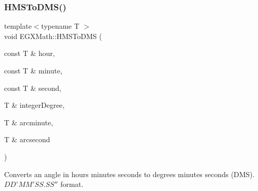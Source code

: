 \subsubsection{\texorpdfstring{H\+M\+S\+To\+D\+M\+S()}{HMSToDMS()}}
{\footnotesize\ttfamily template$<$typename T $>$ \\
void E\+G\+X\+Math\+::\+H\+M\+S\+To\+D\+MS (\begin{DoxyParamCaption}\item[{const T \&}]{hour,  }\item[{const T \&}]{minute,  }\item[{const T \&}]{second,  }\item[{T \&}]{integer\+Degree,  }\item[{T \&}]{arcminute,  }\item[{T \&}]{arcsecond }\end{DoxyParamCaption})}



Converts an angle in hours minutes seconds to degrees minutes seconds (D\+MS). ${DD}^{\circ}{MM}'{SS.SS}''$ format. 

